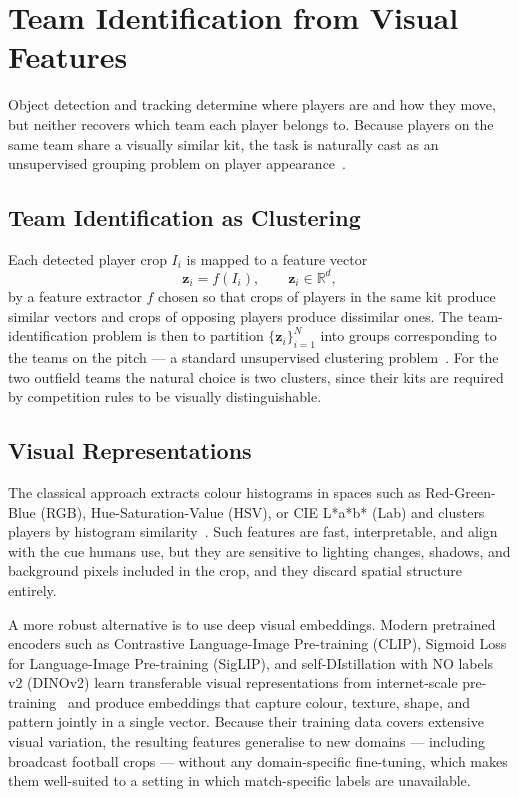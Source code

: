 \section{Team Identification from Visual Features}
\label{sec:background_team_id}

Object detection and tracking determine where players are 
and how they move, but neither recovers which team each 
player belongs to. Because players on the same team share 
a visually similar kit, the task is naturally cast as an 
unsupervised grouping problem on player 
appearance~\cite{Spagnolo2007}.

\subsection{Team Identification as Clustering}
\label{subsec:team_id_clustering}

Each detected player crop \(I_i\) is mapped to a feature 
vector
\begin{equation}
    \mathbf{z}_i = f(I_i), \qquad \mathbf{z}_i \in \mathbb{R}^{d},
    \label{eq:team_embedding}
\end{equation}
by a feature extractor \(f\) chosen so that crops of players 
in the same kit produce similar vectors and crops of 
opposing players produce dissimilar ones. The 
team-identification problem is then to partition 
\(\{\mathbf{z}_i\}_{i=1}^{N}\) into groups corresponding to 
the teams on the pitch — a standard unsupervised clustering 
problem~\cite{MacQueen1967}. For the two outfield teams the 
natural choice is two clusters, since their kits are 
required by competition rules to be visually distinguishable.

\subsection{Visual Representations}
\label{subsec:team_id_representations}

The classical approach extracts colour histograms in spaces 
such as Red-Green-Blue (RGB), Hue-Saturation-Value (HSV), or CIE L*a*b* (Lab) and clusters players by histogram
similarity~\cite{Spagnolo2007}. Such features are 
fast, interpretable, and align with the cue humans use, but 
they are sensitive to lighting changes, shadows, and 
background pixels included in the crop, and they discard 
spatial structure entirely.

A more robust alternative is to use deep visual embeddings. 
Modern pretrained encoders such as Contrastive Language-Image Pre-training (CLIP), Sigmoid Loss for Language-Image Pre-training (SigLIP), and
self-DIstillation with NO labels v2 (DINOv2) learn transferable visual representations from
internet-scale pre-training~\cite{radford2021clip,SigLIP2023,oquab2024dinov2} 
and produce embeddings that capture colour, texture, shape, 
and pattern jointly in a single vector. Because their 
training data covers extensive visual variation, the 
resulting features generalise to new domains — including 
broadcast football crops — without any domain-specific 
fine-tuning, which makes them well-suited to a setting in 
which match-specific labels are unavailable.

